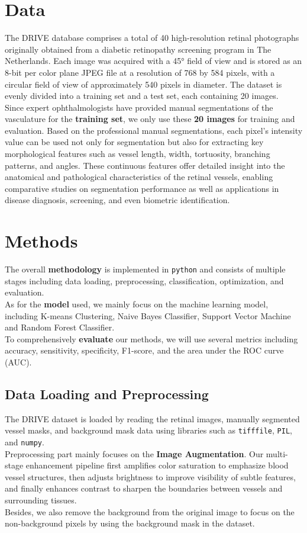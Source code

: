 \documentclass[final]{article}
\begin{document}
\section{Data}
The DRIVE database comprises a total of 40 high-resolution retinal photographs originally obtained from a diabetic retinopathy screening program in The Netherlands. Each image was acquired with a 45° field of view and is stored as an 8-bit per color plane JPEG file at a resolution of 768 by 584 pixels, with a circular field of view of approximately 540 pixels in diameter. The dataset is evenly divided into a training set and a test set, each containing 20 images. \\
Since expert ophthalmologists have provided manual segmentations of the vasculature for the \textbf{training set}, we only use these \textbf{20 images} for training and evaluation. Based on the professional manual segmentations, each pixel's intensity value can be used not only for segmentation but also for extracting key morphological features such as vessel length, width, tortuosity, branching patterns, and angles. These continuous features offer detailed insight into the anatomical and pathological characteristics of the retinal vessels, enabling comparative studies on segmentation performance as well as applications in disease diagnosis, screening, and even biometric identification.



\section{Methods}
The overall \textbf{methodology} is implemented in \texttt{python} and consists of multiple stages including data loading, preprocessing, classification, optimization, and evaluation. \\
As for the \textbf{model} used, we mainly focus on the machine learning model, including K-means Clustering, Naive Bayes Classifier, Support Vector Machine and Random Forest Classifier. \\
To comprehensively \textbf{evaluate} our methods, we will use several metrics including accuracy, sensitivity, specificity, F1-score, and the area under the ROC curve (AUC).
\subsection{Data Loading and Preprocessing}
The DRIVE dataset is loaded by reading the retinal images, manually segmented vessel masks, and background mask data using libraries such as \texttt{tifffile}, \texttt{PIL}, and \texttt{numpy}. \\
Preprocessing part mainly focuses on the \textbf{Image Augmentation}. Our multi-stage enhancement pipeline first amplifies color saturation to emphasize blood vessel structures, then adjusts brightness to improve visibility of subtle features, and finally enhances contrast to sharpen the boundaries between vessels and surrounding tissues. \\
Besides, we also remove the background from the original image to focus on the non-background pixels by using the background mask in the dataset. 
\end{document}
